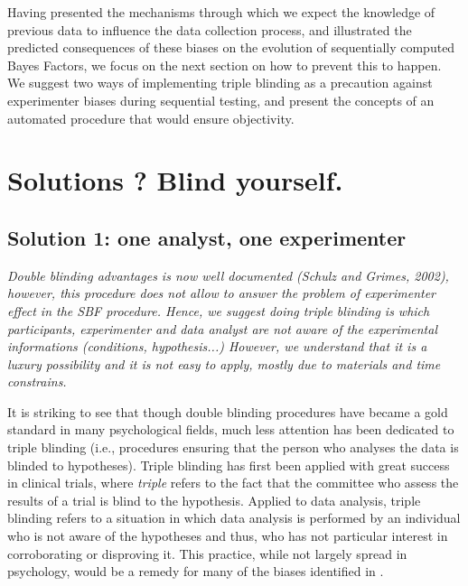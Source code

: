 \documentclass[a4paper,man,natbib,floatsintext,donotrepeattitle]{apa6}
\begin{document}
Having presented the mechanisms through which we expect the knowledge of previous data to influence the data collection process, and illustrated the predicted consequences of these biases on the evolution of sequentially computed Bayes Factors, we focus on the next section on how to prevent this to happen. We suggest two ways of implementing triple blinding as a precaution against experimenter biases during sequential testing, and present the concepts of an automated procedure that would ensure objectivity.

\section{Solutions ? Blind yourself.}

\subsection{Solution 1: one analyst, one experimenter}

\textit{Double blinding advantages is now well documented (Schulz and Grimes, 2002), however, this procedure does not allow to answer the problem of experimenter effect in the SBF procedure. Hence, we suggest doing triple blinding is which participants, experimenter and data analyst are not aware of the experimental informations (conditions, hypothesis...) However, we understand that it is a luxury possibility and it is not easy to apply, mostly due to materials and time constrains.}


It is striking to see that though double blinding procedures have became a gold standard in many psychological fields, much less attention has been dedicated to triple blinding (i.e., procedures ensuring that the person who analyses the data is blinded to hypotheses). Triple blinding has first been applied with great success in clinical trials, where \textit{triple} refers to the fact that the committee who assess the results of a trial is blind to the hypothesis. Applied to data analysis, triple blinding refers to a situation in which data analysis is performed by an individual who is not aware of the hypotheses and thus, who has not particular interest in corroborating or disproving it. This practice, while not largely spread in psychology, would be a remedy for many of the biases identified in \cite{wicherts_degrees_2016}.
\end{document}

